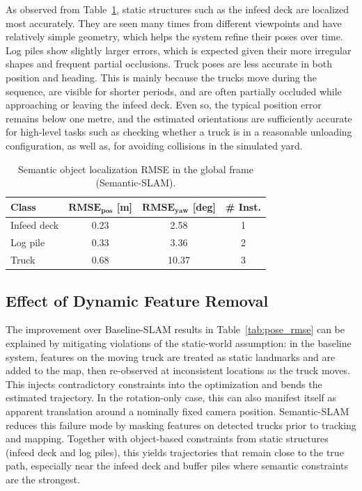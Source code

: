 \documentclass[letterpaper, 10 pt, conference]{IEEEtran}  %
\begin{document}
As observed from Table~\ref{tab:obj_rmse}, static structures such as the infeed deck are localized most accurately. They are seen many times from different viewpoints and have relatively simple geometry, which helps the system refine their poses over time. Log piles show slightly larger errors, which is expected given their more irregular shapes and frequent partial occlusions. Truck poses are less accurate in both position and heading. This is mainly because the trucks move during the sequence, are visible for shorter periods, and are often partially occluded while approaching or leaving the infeed deck. Even so, the typical position error remains below one metre, and the estimated orientations are sufficiently accurate for high-level tasks such as checking whether a truck is in a reasonable unloading configuration, as well as, for avoiding collisions in the simulated yard.

\begin{table}[t]
\centering
\caption{Semantic object localization RMSE in the global frame (Semantic-SLAM).}
\label{tab:obj_rmse}
\setlength{\tabcolsep}{6pt}
\renewcommand{\arraystretch}{1.12}
\begin{tabular}{lccc}
\toprule
\textbf{Class} & $\mathbf{RMSE_{pos}}$ \textbf{[m]} & $\mathbf{RMSE_{yaw}}$ \textbf{[deg]} & \textbf{\# Inst.} \\
\midrule
Infeed deck & 0.23 & 2.58 & 1 \\
Log pile    & 0.33 & 3.36 & 2 \\
Truck       & 0.68 & 10.37 & 3 \\
\bottomrule
\end{tabular}
\end{table}

\subsection{Effect of Dynamic Feature Removal}
The improvement over Baseline-SLAM results in Table~\ref{tab:pose_rmse} can be explained by mitigating violations of the static-world assumption: in the baseline system, features on the moving truck are treated as static landmarks and are added to the map, then re-observed at inconsistent locations as the truck moves. This injects contradictory constraints into the optimization and bends the estimated trajectory. In the rotation-only case, this can also manifest itself as apparent translation around a nominally fixed camera position. Semantic-SLAM reduces this failure mode by masking features on detected trucks prior to tracking and mapping. Together with object-based constraints from static structures (infeed deck and log piles), this yields trajectories that remain close to the true path, especially near the infeed deck and buffer piles where semantic constraints are the strongest.
\end{document}
